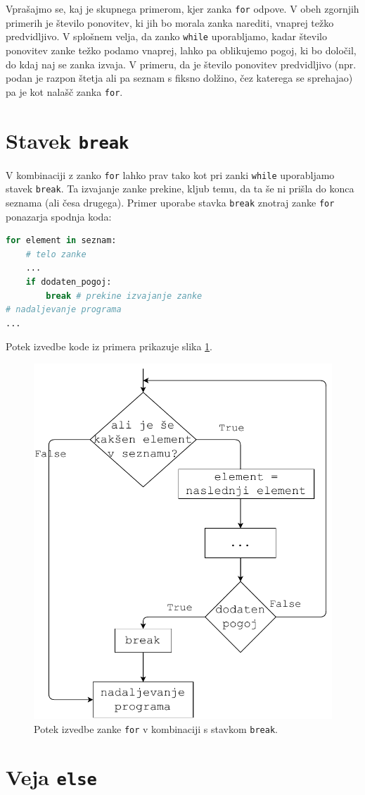 Vprašajmo se, kaj je skupnega primerom, kjer zanka \texttt{for} odpove. V obeh zgornjih primerih je število ponovitev, ki jih bo morala zanka narediti, vnaprej težko predvidljivo. V splošnem velja, da zanko \texttt{while} uporabljamo, kadar število ponovitev zanke težko podamo vnaprej, lahko pa oblikujemo pogoj, ki bo določil, do kdaj naj se zanka izvaja. V primeru, da je število ponovitev predvidljivo (npr. podan je razpon štetja ali pa seznam s fiksno dolžino, čez katerega se sprehajao) pa je kot nalašč zanka \texttt{for}.

\section{Stavek \texttt{break}}

V kombinaciji z zanko \texttt{for} lahko prav tako kot pri zanki \texttt{while} uporabljamo stavek \texttt{break}. Ta izvajanje zanke prekine, kljub temu, da ta še ni prišla do konca seznama (ali česa drugega). Primer uporabe stavka \texttt{break} znotraj zanke \texttt{for} ponazarja spodnja koda:
\begin{lstlisting}[language=Python]
for element in seznam:
    # telo zanke
    ...
    if dodaten_pogoj: 
        break # prekine izvajanje zanke
# nadaljevanje programa
...
\end{lstlisting}
Potek izvedbe kode iz primera prikazuje slika \ref{img:for2}.
\begin{figure}
    \centering
    \includegraphics[width=0.5\linewidth]{img/for2.pdf}
    \caption{Potek izvedbe zanke \texttt{for} v kombinaciji s stavkom \texttt{break}.}
    \label{img:for2}
\end{figure}


\section{Veja \texttt{else}}

